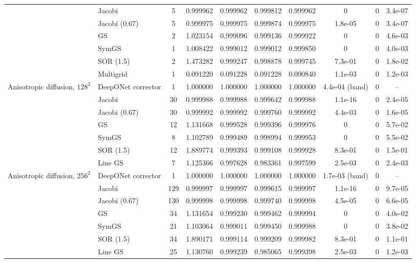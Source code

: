 {\begin{tabular}{llcccccccc}
 & Jacobi & 5 & 0.999962 & 0.999962 & 0.999812 & 0.999962 & 0 & 0 & 3.4e-07 \\
 & Jacobi (0.67) & 5 & 0.999975 & 0.999975 & 0.999874 & 0.999975 & 1.8e-05 & 0 & 3.4e-07 \\
 & GS & 2 & 1.023154 & 0.999096 & 0.999136 & 0.999922 & 0 & 0 & 4.6e-03 \\
 & SymGS & 1 & 1.008422 & 0.999012 & 0.999012 & 0.999850 & 0 & 0 & 4.0e-03 \\
 & SOR (1.5) & 2 & 1.473282 & 0.999247 & 0.998878 & 0.999745 & 7.3e-01 & 0 & 1.8e-02 \\
 & Multigrid & 1 & 0.091220 & 0.091228 & 0.091228 & 0.090840 & 1.1e-03 & 0 & 1.2e-03 \\
\midrule
Anisotropic diffusion, $128^2$ & DeepONet corrector & 1 & 1.000000 & 1.000000 & 1.000000 & 1.000000 & 4.4e-04 (band) & 0 & -- \\
 & Jacobi & 30 & 0.999988 & 0.999988 & 0.999642 & 0.999988 & 1.1e-16 & 0 & 2.4e-05 \\
 & Jacobi (0.67) & 30 & 0.999992 & 0.999992 & 0.999760 & 0.999992 & 4.4e-03 & 0 & 1.6e-05 \\
 & GS & 12 & 1.131668 & 0.999528 & 0.999396 & 0.999976 & 0 & 0 & 5.7e-02 \\
 & SymGS & 8 & 1.102789 & 0.999489 & 0.998994 & 0.999953 & 0 & 0 & 5.5e-02 \\
 & SOR (1.5) & 12 & 1.889774 & 0.999393 & 0.999108 & 0.999928 & 8.3e-01 & 0 & 1.5e-01 \\
 & Line GS & 7 & 1.125366 & 0.997628 & 0.983361 & 0.997599 & 2.5e-03 & 0 & 2.4e-03 \\
\midrule
Anisotropic diffusion, $256^2$ & DeepONet corrector & 1 & 1.000000 & 1.000000 & 1.000000 & 1.000000 & 1.7e-03 (band) & 0 & -- \\
 & Jacobi & 129 & 0.999997 & 0.999997 & 0.999615 & 0.999997 & 1.1e-16 & 0 & 9.7e-05 \\
 & Jacobi (0.67) & 130 & 0.999998 & 0.999998 & 0.999740 & 0.999998 & 4.5e-05 & 0 & 6.6e-05 \\
 & GS & 34 & 1.131654 & 0.999230 & 0.999462 & 0.999994 & 0 & 0 & 4.0e-02 \\
 & SymGS & 21 & 1.103064 & 0.999011 & 0.999450 & 0.999988 & 0 & 0 & 3.8e-02 \\
 & SOR (1.5) & 34 & 1.890171 & 0.999114 & 0.999209 & 0.999982 & 8.3e-01 & 0 & 1.1e-01 \\
 & Line GS & 25 & 1.130760 & 0.999239 & 0.985065 & 0.999398 & 2.5e-03 & 0 & 1.2e-03 \\
\midrule

\end{tabular}}
